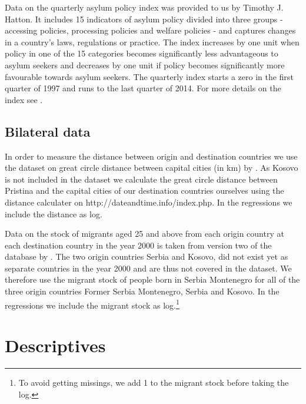 \documentclass[11pt,a4paper]{scrartcl}
\begin{document}
Data on the quarterly asylum policy index was provided to us by Timothy J. Hatton. It includes 15 indicators of asylum policy divided into three groups - accessing policies, processing policies and welfare policies - and captures changes in a country’s laws, regulations or practice. The index increases by one unit when policy in one of the 15 categories becomes significantly less advantageous to asylum seekers and decreases by one unit if policy becomes significantly more favourable towards asylum seekers. The quarterly index starts a zero in the first quarter of 1997 and runs to the last quarter of 2014. For more details on the index see \textcites{hatton2009, hatton2015}.
\subsection{Bilateral data}

In order to measure the distance between origin and destination countries we use the dataset on great circle distance between capital cities (in km) by \textcite{distance2017}. As Kosovo is not included in the dataset we calculate the great circle distance between Pristina and the capital cities of our destination countries ourselves using the distance calculater on http://dateandtime.info/index.php. In the regressions we include the distance as log.

Data on the stock of migrants aged 25 and above from each origin country at each destination country in the year 2000 is taken from version two of the database by \textcite{artuc2015}. The two origin countries Serbia and Kosovo, did not exist yet as separate countries in the year 2000 and are thus not covered in the dataset. We therefore use the migrant stock of people born in Serbia Montenegro for all of the three origin countries Former Serbia Montenegro, Serbia and Kosovo. In the regressions we include the migrant stock as log.\footnote{To avoid getting missings, we add 1 to the migrant stock before taking the log.} 


\clearpage
\FloatBarrier
\section{Descriptives}


 

 
 
\end{document}
